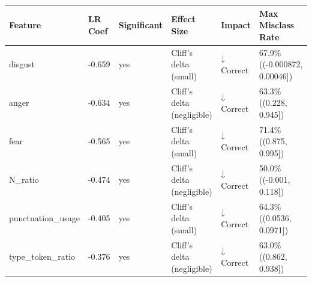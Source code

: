 \begin{tabular}{llllll}
\toprule
Feature & LR Coef & Significant & Effect Size & Impact & Max Misclass Rate \\
\midrule
disgust & -0.659 & yes & Cliff's delta (small) & ↓ Correct & 67.9\% ((-0.000872, 0.00046]) \\
anger & -0.634 & yes & Cliff's delta (negligible) & ↓ Correct & 63.3\% ((0.228, 0.945]) \\
fear & -0.565 & yes & Cliff's delta (small) & ↓ Correct & 71.4\% ((0.875, 0.995]) \\
N\_ratio & -0.474 & yes & Cliff's delta (negligible) & ↓ Correct & 50.0\% ((-0.001, 0.118]) \\
punctuation\_usage & -0.405 & yes & Cliff's delta (small) & ↓ Correct & 64.3\% ((0.0536, 0.0971]) \\
type\_token\_ratio & -0.376 & yes & Cliff's delta (negligible) & ↓ Correct & 63.0\% ((0.862, 0.938]) \\
\bottomrule
\end{tabular}
